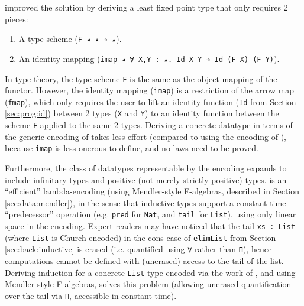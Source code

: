 \documentclass[acmsmall,screen]{acmart}
\newcommand{\refsec}[1]{Section \ref{sec:#1}}
\begin{document}
\citet{firsov18b} improved the solution by deriving a
least fixed point type that only requires 2 pieces:
\begin{enumerate}
\item A type scheme (\verb;F ◂ ★ ➔ ★;).
\item An identity mapping
  (\verb;imap ◂ ∀ X,Y : ★. Id X Y ➔ Id (F X) (F Y);).
\end{enumerate}

In type theory, the type scheme \verb;F; is the same as the object
mapping of the functor. However, the identity mapping (\verb;imap;) is
a restriction of the arrow map (\verb;fmap;), which only requires the
user to lift an identity function
(\verb;Id; from \refsec{prog:id}) between 2 types
(\verb;X; and \verb;Y;) to an identity function
between the scheme \verb;F; applied to the same 2 types.
Deriving a concrete datatype in terms of the generic encoding of
\citet{firsov18b} takes less effort (compared to using the encoding of
\citet{firsov18a}), because \verb;imap; is less onerous to define, and no
laws need to be proved.

Furthermore, the class of datatypes representable by the
\citet{firsov18b} encoding expands to include infinitary types and
positive (not merely strictly-positive) types. \citet{firsov18b} is an
``efficient'' lambda-encoding (using Mendler-style F-algebras,
described in \refsec{data:mendler}), in the
sense that inductive types support a constant-time ``predecessor''
operation (e.g. \verb;pred; for \verb;Nat;, and \verb;tail; for
\verb;List;), using only linear space in the encoding.
Expert readers may have noticed that the tail \verb;xs : List;
(where \verb;List; is Church-encoded) in
the cons case of \verb;elimList; from \refsec{back:inductive} is
erased (i.e. quantified using \verb;∀; rather than \verb;Π;), hence
computations cannot be defined with (unerased) access to the tail of the
list. Deriving induction for a concrete \verb;List; type
encoded via the work of \citet{firsov18b},
and using Mendler-style F-algebras,
solves this problem (allowing unerased quantification over the tail
via \verb;Π;, accessible in constant time).
\end{document}
